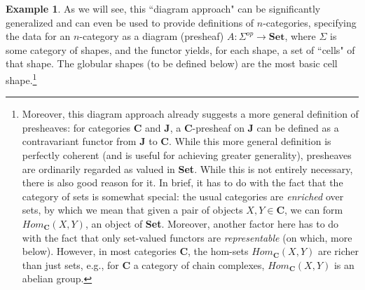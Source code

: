 \documentclass[a4paper]{book}
\theoremstyle{definition}
\newtheorem{example}{Example}[section]
\theoremstyle{definition}
\theoremstyle{definition}
\theoremstyle{theorem}
\theoremstyle{definition}
\begin{document}
\begin{example}
	As we will see, this ``diagram approach" can be significantly generalized and can even be used to provide definitions of $n$-categories, specifying the data for an $n$-category as a diagram (presheaf) $A: \Sigma^{op} \rightarrow \textbf{Set}$, where $\Sigma$ is some category of shapes, and the functor yields, for each shape, a set of ``cells" of that shape. The globular shapes (to be defined below) are the most basic cell shape.\footnote{Moreover, this diagram approach already suggests a more general definition of presheaves: for categories \textbf{C} and \textbf{J}, a \textbf{C}-presheaf on \textbf{J} can be defined as a contravariant functor from \textbf{J} to \textbf{C}. While this more general definition is perfectly coherent (and is useful for achieving greater generality), presheaves are ordinarily regarded as valued in \textbf{Set}. While this is not entirely necessary, there is also good reason for it. In brief, it has to do with the fact that the category of sets is somewhat special: the usual categories are \textit{enriched} over sets, by which we mean that given a pair of objects $X, Y \in \textbf{C}$, we can form $Hom_{\textbf{C}}(X,Y)$, an object of \textbf{Set}. Moreover, another factor here has to do with the fact that only set-valued functors are \textit{representable} (on which, more below). However, in most categories $\textbf{C}$, the hom-sets $Hom_{\textbf{C}}(X,Y)$ are richer than just sets, e.g., for $\textbf{C}$ a category of chain complexes, $Hom_{\textbf{C}}(X,Y)$ is an abelian group.}
\end{example} 
\end{document}
